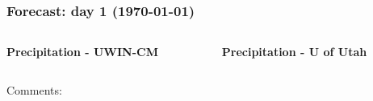 \documentclass[aspectratio=169, 10pt]{beamer}
\begin{document}
\begin{frame}
\frametitle{Forecast: day 1 ({\AdvanceDate[+1]\today})}

\vspace{-.3cm}
\begin{columns}
\begin{column}{0.5\textwidth}
\begin{center}
\textbf{Precipitation - UWIN-CM}\\
\end{center}
\end{column}

\begin{column}{0.5\textwidth}
\begin{center}
\textbf{Precipitation - U of Utah} \\
\end{center}
\end{column}
\end{columns}

\begin{figure}


\end{figure}

Comments:
\vspace{4cm}


\end{frame}
\end{document}
